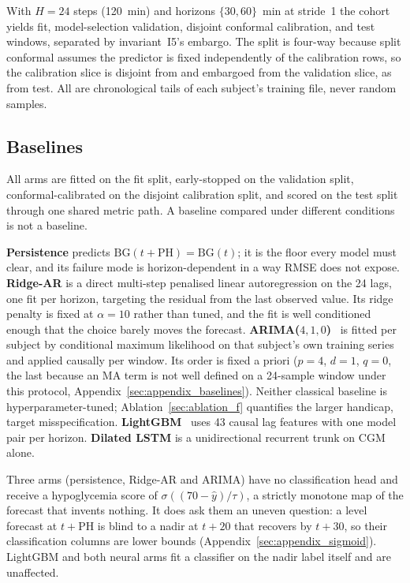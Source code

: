 \documentclass[pmlr,twocolumn,10pt]{jmlr}
\newcommand{\PH}{\mathrm{PH}}
\newcommand{\BG}{\mathrm{BG}}
\begin{document}
With $H = 24$ steps (120~min) and horizons $\{30, 60\}$~min at stride~1 the
cohort yields \NumFitWindows{} fit, \NumValWindows{} model-selection validation,
\NumCalibWindows{} disjoint conformal calibration, and \NumTestWindows{} test windows,
separated by invariant~I5's embargo. The split is four-way because split conformal 
assumes the predictor is fixed independently of the calibration rows, so the calibration 
slice is disjoint from and embargoed from the validation slice, as from test. All are 
chronological tails of each subject's training file, never random samples.

\subsection{Baselines}
\label{sec:baselines}

All arms are fitted on the fit split, early-stopped on the validation split,
conformal-calibrated on the disjoint calibration split, and scored on the test
split through one shared metric path. A baseline compared under different conditions 
is not a baseline.

\textbf{Persistence} predicts $\BG(t{+}\PH) = \BG(t)$; it is the floor every
model must clear, and its failure mode is horizon-dependent in a way RMSE does not
expose.
\textbf{Ridge-AR} is a direct multi-step penalised linear autoregression on the
24 lags, one fit per horizon, targeting the residual from the last observed
value. Its ridge penalty is fixed at $\alpha = 10$ rather than tuned, and the fit is
well conditioned enough that the choice barely moves the forecast. 
\textbf{ARIMA($4,1,0$)}~\citep{box2015time} is fitted per
subject by conditional maximum likelihood on that subject's own training series
and applied causally per window. Its order is fixed a priori ($p = 4$, $d = 1$, $q = 0$, the last because an MA
term is not well defined on a 24-sample window under this protocol,
Appendix~\ref{sec:appendix_baselines}). Neither classical baseline is
hyperparameter-tuned; Ablation~\ref{sec:ablation_f} quantifies the larger
handicap, target misspecification.
\textbf{LightGBM}~\citep{ke2017lightgbm} uses 43 causal lag features
with one model pair per horizon. 
\textbf{Dilated LSTM} is a unidirectional
recurrent trunk on CGM alone.

Three arms (persistence, Ridge-AR and ARIMA) have no classification head and
receive a hypoglycemia score of $\sigma\!\left((70 - \hat{y})/\tau\right)$, a
strictly monotone map of the forecast that invents nothing. It does ask them an
uneven question: a level forecast at $t{+}\PH$ is blind to a nadir at $t{+}20$
that recovers by $t{+}30$, so their classification columns are lower bounds
(Appendix~\ref{sec:appendix_sigmoid}). LightGBM and both neural arms fit a
classifier on the nadir label itself and are unaffected.
\end{document}
